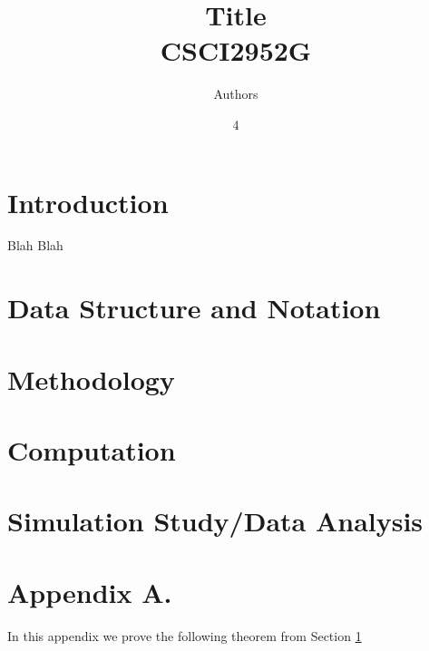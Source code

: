 \documentclass[twoside,11pt]{article}
\begin{document}
\title{	Title \\
\vspace{.1in}
CSCI2952G			
}

\author{ Authors }

\maketitle
\date{4 }

\section{Introduction} \label{sec:intro}

Blah Blah 

\section{Data Structure and Notation} \label{sec:data}

\section{Methodology} \label{sec:methods}

\section{Computation} \label{sec:comp}

\section{Simulation Study/Data Analysis} \label{sec:comp}

\newpage

\appendix
\section*{Appendix A.} \label{sec:app_a}
In this appendix we prove the following theorem from
Section \ref{sec:intro}


\newpage 

\end{document}
